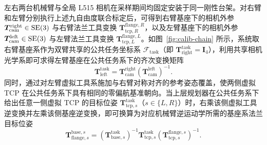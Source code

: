 左右两台机械臂与全局 L515 相机在采样期间均固定安装于同一刚性台架。对右臂和左臂分别执行上述九自由度联合标定后，可得到右臂基座下的相机外参 $\bm{T}_{\text{cam}}^{\text{right}} \in \mathrm{SE}(3)$ 与右臂法兰工具变换 $\bm{T}_{\text{tcp},R}^{\text{flange},R}$，以及左臂基座下的相机外参 $\bm{T}_{\text{cam}}^{\text{left}} \in \mathrm{SE}(3)$ 与左臂法兰工具变换 $\bm{T}_{\text{tcp},L}^{\text{flange},L}$。如图~\ref{fig:calib-chain} 所示，系统取右臂基座系作为双臂共享的公共任务坐标系 $\mathcal{F}_{\text{task}}$（即 $\bm{T}_{\text{right}}^{\text{task}} = \bm{I}_4$），利用共享相机光学系即可求得左臂基座在公共任务系下的齐次变换矩阵
\begin{equation}
  \bm{T}_{\text{left}}^{\text{task}} = \bm{T}_{\text{cam}}^{\text{right}} \left(\bm{T}_{\text{cam}}^{\text{left}}\right)^{-1}.
  \label{eq:left-base-in-task}
\end{equation}
同时，通过对左臂虚拟工具系施加与右臂对称对齐的参考姿态覆盖，使两侧虚拟 TCP 在公共任务系下具有相同的零偏航基准朝向。当上层规划器在公共任务系下给出任意一侧虚拟 TCP 的目标位姿 $\bm{T}_{\text{tcp},s}^{\text{task}}$（$s \in \{L, R\}$）时，右乘该侧虚拟工具逆变换并左乘该侧基座逆变换，即可换算为对应机械臂逆运动学所需的基座系法兰目标位姿
\begin{equation}
  \bm{T}_{\text{flange},s}^{\text{base},s} = \left(\bm{T}_{\text{base},s}^{\text{task}}\right)^{-1} \bm{T}_{\text{tcp},s}^{\text{task}} \left(\bm{T}_{\text{tcp},s}^{\text{flange},s}\right)^{-1}.
  \label{eq:task-tcp-to-base-flange}
\end{equation}

